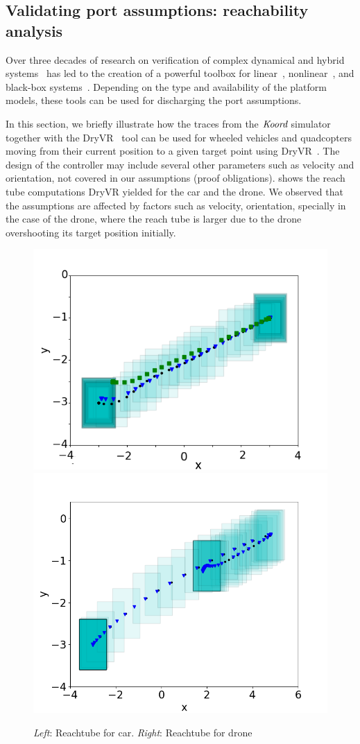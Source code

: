\subsection{Validating port assumptions: reachability analysis}
\label{sec:port-assumptions}
 Over  three decades of research on verification of complex dynamical and hybrid systems~\cite{Alur:2015:PCS,Platzer:2018} has led to the creation of a powerful toolbox for linear~\cite{bak2017hylaa,Spaceex}, nonlinear~\cite{CAS13,DMVemsoft2013,FanQM0D16:CAV}, and black-box systems~\cite{DryVR2017}. Depending on the type and availability of the platform models, these tools can be used for discharging the port assumptions. 

In this section, we briefly illustrate how the traces from the $\emph{Koord}$ simulator together with the DryVR~\cite{DryVR2017} tool can be used  for wheeled vehicles and quadcopters  moving from their current position to a given target point using DryVR~\cite{DryVR2017}. The design of the controller may include several other parameters such as velocity and orientation, not covered in our assumptions (proof obligations).  shows the reach tube computations DryVR yielded for the car and the drone. We observed that the assumptions are affected by factors such as velocity, orientation, specially in the case of the drone, where the reach tube is larger due to the drone overshooting its target position initially.

\begin{figure}[!h]
    \includegraphics[width=0.4\linewidth]{figs/car_trajs.png}
    \includegraphics[width=0.4\linewidth]{figs/drone_trajs.png}
    \caption{\emph{Left}: Reachtube for car. \emph{Right}: Reachtube for drone}\label{fig:dryvr}
\end{figure}

